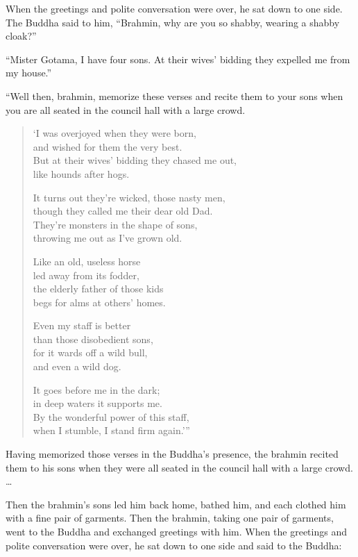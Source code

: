 \documentclass[12pt,openany]{book}%
\begin{document}
When the greetings and polite conversation were over, he sat down to one side. The Buddha said to him, “Brahmin, why are you so shabby, wearing a shabby cloak?” 

“Mister Gotama, I have four sons. At their wives’ bidding they expelled me from my house.” 

“Well then, brahmin, memorize these verses and recite them to your sons when you are all seated in the council hall with a large crowd. 

\begin{verse}%
‘I was overjoyed when they were born, \\
and wished for them the very best. \\
But at their wives’ bidding they chased me out, \\
like hounds after hogs. 

It turns out they’re wicked, those nasty men, \\
though they called me their dear old Dad. \\
They’re monsters in the shape of sons, \\
throwing me out as I’ve grown old. 

Like an old, useless horse \\
led away from its fodder, \\
the elderly father of those kids \\
begs for alms at others’ homes. 

Even my staff is better \\
than those disobedient sons, \\
for it wards off a wild bull, \\
and even a wild dog. 

It goes before me in the dark; \\
in deep waters it supports me. \\
By the wonderful power of this staff, \\
when I stumble, I stand firm again.’” 

%
\end{verse}

Having memorized those verses in the Buddha’s presence, the brahmin recited them to his sons when they were all seated in the council hall with a large crowd. … 

Then the brahmin’s sons led him back home, bathed him, and each clothed him with a fine pair of garments. Then the brahmin, taking one pair of garments, went to the Buddha and exchanged greetings with him. When the greetings and polite conversation were over, he sat down to one side and said to the Buddha: 
\end{document}
